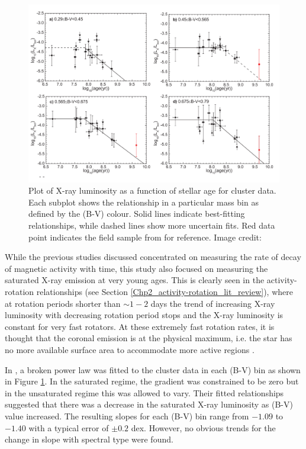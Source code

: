 \begin{figure}[t]
    \centering
    \includegraphics[scale=0.45]{Figures/2-Historical_overview/jackson_etal_2012_part.pdf}
    \caption[\citet{Jackson_etal_2012} X-ray luminosity - age relationship for sample of clusters]{Plot of X-ray luminosity as a function of stellar age for cluster data. Each subplot shows the relationship in a particular mass bin as defined by the (B-V) colour. Solid lines indicate best-fitting relationships, while dashed lines show more uncertain fits. Red data point indicates the field sample from \citet{Pizzolato_etal_2003} for reference. Image credit: \citet{Jackson_etal_2012}}
    \label{fig:jackson_etal_2012_plot}
\end{figure}

While the previous studies discussed concentrated on measuring the rate of decay of magnetic activity with time, this study also focused on measuring the saturated X-ray emission at very young ages. This is clearly seen in the activity-rotation relationships (see Section \ref{Chp2_activity-rotation_lit_review}), where at rotation periods shorter than $\sim 1-2$ days the trend of increasing X-ray luminosity with decreasing rotation period stops and the X-ray luminosity is constant for very fast rotators. At these extremely fast rotation rates, it is thought that the coronal emission is at the physical maximum, i.e. the star has no more available surface area to accommodate more active regions \citep{Jardine_Unruh_1999}.

In \citet{Jackson_etal_2012}, a broken power law was fitted to the cluster data in each (B-V) bin as shown in Figure \ref{fig:jackson_etal_2012_plot}. In the saturated regime, the gradient was constrained to be zero but in the unsaturated regime this was allowed to vary. Their fitted relationships suggested that there was a decrease in the saturated X-ray luminosity as (B-V) value increased. The resulting slopes for each (B-V) bin range from $-1.09$ to $-1.40$ with a typical error of $\pm 0.2$ dex. However, no obvious trends for the change in slope with spectral type were found.

